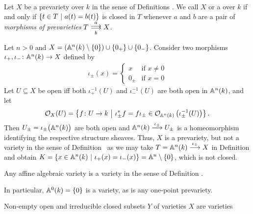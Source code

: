 \documentclass[a4paper,parskip=half,numbers=enddot, DIV=12]{scrreprt}
\begin{document}
\begin{defi}[Variety]
    Let $X$ be a prevariety over $k$ in the sense of Definitions . We call $X$  or a  over $k$ if and only if $\left\{t\in T\ \middle|\  a(t)=b(t)\right\}$ is closed in $T$ whenever $a$ and $b$ are a pair of \emph{morphisms of prevarieties} $T\doublemorphism[a][b] X$. 
\end{defi}

\begin{example}
    Let $n>0$ and $X = \left( \mathbb{A}^n(k) \setminus\{0\}\right) \cup \{0_+\} \cup \{0_-\}$. Consider two morphisms $\iota_+,\iota_-\colon \mathbb{A}^n(k) \to X$ defined by
    \begin{align*}
	\iota_\pm(x) = \begin{cases} x &\text{if }x\neq 0\\
			0_\pm &\text{if } x = 0
		    \end{cases}
    \end{align*}
    Let $U\subseteq X$ be open iff both $\iota_+^{-1} (U)$ and $\iota_-^{-1}(U)$ are both open in $\mathbb{A}^n(k)$, and let 
    \begin{align*}
        \mathcal{O}_X(U) = \left\{f\colon U\to k\ \middle|\  \iota_\pm^* f = f \iota_\pm \in \mathcal{O}_{\mathbb{A}^n(k)} \left(\iota_\pm^{-1}(U)\right)\right\}.
    \end{align*}
    Then $U_\pm = \iota_\pm\big(\mathbb{A}^n(k)\big)$ are both open and $\IA^n(k)\morphism[\iota_\pm] U_\pm$ is a homeomorphism identifying the respective structure sheaves. Thus, $X$ is a prevariety, but not a variety in the sense of Definition~ as we may take $T=\IA^n(k) \morphism[\iota_\pm] X$ in Definition  and obtain $K = \left\{x\in \mathbb{A}^n(k)\ \middle|\  \iota_+(x) = \iota_-(x)\right\} = \mathbb{A}^n\setminus\{0\}$, which is not closed.
\end{example}
\begin{example}
    \begin{alphanumerate}
    \item {}
        Any affine algebraic variety is a variety in the sense of Definition .
    \item
        In particular, $\mathbb{A}^0(k) = \{0\}$ is a variety, as is any one-point prevariety.
    \item 
        Non-empty open and irreducible closed subsets $Y$ of varieties $X$ are varieties 
    \end{alphanumerate}
\end{example}
\end{document}
